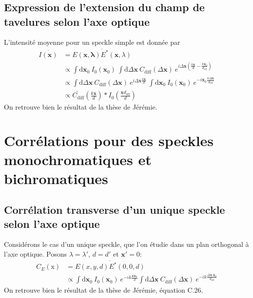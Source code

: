 \subsection{Expression de l'extension du champ de tavelures selon l'axe optique}
L'intensité moyenne pour un speckle simple est donnée par
\begin{align}
\overline{I(\mathbf{x})} &= \overline{E(\mathbf{x,\lambda})E^*(\mathbf{x},\lambda)} \\
&\propto \int{\mathrm{d}\mathbf{x}_0 \: I_0(\mathbf{x}_0) \: \int{\mathrm{d}\Delta \mathbf{x} \: C_{\mathrm{diff}}(\Delta \mathbf{x}) \: e^{i\Delta \mathbf{x} \left( \frac{k\mathbf{x}}{d}-\frac{k\mathbf{x}_0}{d_{\mathrm{eff}}}\right)}}} \\
&\propto \int{\mathrm{d}\Delta\mathbf{x} \: C_{\mathrm{diff}}(\Delta\mathbf{x}) \: e^{i \Delta\mathbf{x} \frac{k\mathbf{x}}{d}} \: \int{\mathrm{d}\mathbf{x}_0 \: I_0(\mathbf{x}_0) \: e^{-i \mathbf{x}_0 \frac{k\Delta\mathbf{x}}{d_{\mathrm{eff}}}}}} \\
&\propto \widetilde{C_{\mathrm{diff}}}(\frac{k\mathbf{x}}{d}) \ast I_0(\frac{\mathbf{x}d_{\mathrm{eff}}}{d})
\end{align}
On retrouve bien le résultat de la thèse de Jérémie.

\section{Corrélations pour des speckles monochromatiques et bichromatiques}
\subsection{Corrélation transverse d'un unique speckle selon l'axe optique}
Considérons le cas d'un unique speckle, que l'on étudie dans un plan orthogonal à l'axe optique. Posons $\lambda = \lambda'$, $d=d'$ et $\mathbf{x}'=0$:
\begin{align}
C_E(\mathrm{x})&=\overline{E(x,y,d)E^*(0,0,d)}\\
&\propto \int{\mathrm{d}\mathbf{x}_0 \: I_0(\mathbf{x}_0) \: e^{-ik\frac{\mathbf{x} \mathbf{x}_0}{d}} \int{\mathrm{d}\Delta\mathbf{x} \: C_{\mathrm{diff}}(\Delta\mathbf{x})\: e^{-ik\frac{\Delta\mathbf{x}.\mathbf{x}_0}{d_{\mathrm{eff}}}}}}
\end{align}
On retrouve bien le résultat de la thèse de Jérémie, équation C.26.

